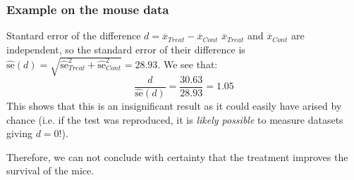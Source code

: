 
\frame
{
\frametitle{Example on the mouse data}


\begin{exampleblock}{Stantard error of the difference $d=\overline{x}_{Treat}-\overline{x}_{Cont}$}
$\overline{x}_{Treat}$ and $\overline{x}_{Cont}$ are independent, so the standard error of their difference is $\hat{\mathrm{se}}(d)=\sqrt{\hat{\mathrm{se}}_{Treat}^2 +\hat{\mathrm{se}}_{Cont}^2 }=28.93$. 
We see that:
$$
\frac{d}{\hat{\mathrm{se}}(d)}
=\frac{30.63}{28.93}=1.05
 $$
This shows that this is an insignificant result as it could easily have arised by chance (i.e. if the test was reproduced, it is \textit{likely possible} to measure datasets giving $d=0$!).  

Therefore, we can not conclude with certainty that the treatment improves the survival of the mice.
\end{exampleblock}
}
